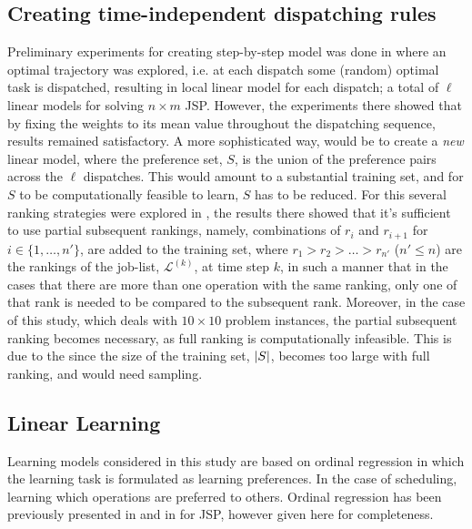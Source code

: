 \documentclass[smallextended]{svjour3}
\begin{document}
	\subsection{Creating time-independent dispatching rules}\label{sec:ord:timeindependent}
	
	Preliminary experiments for creating step-by-step model was done in \cite{InRu11a} where an optimal trajectory was explored, i.e. at each dispatch some (random) optimal task is dispatched, resulting in local linear model for each dispatch; a total of $\ell$ linear models for solving $n\times m$ JSP. However, the experiments there showed that by fixing the weights to its mean value throughout the dispatching sequence, results remained satisfactory.  
	A more sophisticated way, would be to create a \emph{new} linear model, where the preference set, $S$, is the union of the preference pairs across the $\ell$ dispatches. This would amount to a substantial training set, and for $S$ to be computationally feasible to learn, $S$ has to be reduced. For this several ranking strategies were explored in \cite{InRu14b}, the results there showed that it's sufficient to use partial subsequent rankings, namely, combinations of $r_i$ and $r_{i+1}$ for $i\in\{1,\ldots,n'\}$, are added to the training set, where $r_1>r_2>\ldots>r_{n'}$ ($n'\leq n$) are the rankings of the job-list, $\mathcal{L}^{(k)}$, at time step $k$, in such a manner that in the cases that there are more than one operation with the same ranking, only one of that rank is needed to be compared to the subsequent rank. Moreover, in the case of this study, which deals with $10\times 10$ problem instances, the partial subsequent ranking becomes necessary, as full ranking is computationally infeasible. This is due to the since the size of the training set, $\lvert S\rvert$, becomes too large with full ranking, and would need sampling.
	
	
	\subsection{Linear Learning}
	
	
	Learning models considered in this study are based on ordinal regression in which the learning task is formulated as learning preferences. In the case of scheduling, learning which operations are preferred to others. Ordinal regression has been previously presented in \cite{Ru06:PPSN} and in \cite{InRu11a} for JSP, however given here for completeness. 
	
\end{document}
